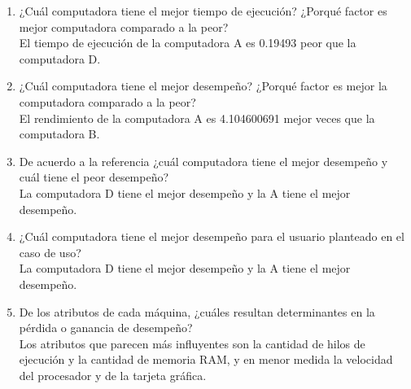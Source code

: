 \documentclass{article}
\begin{document}
    \begin{enumerate}
        \item {
            ¿Cuál computadora tiene el mejor tiempo de ejecución? ¿Porqué 
        factor es mejor computadora comparado a la peor? \\
        El tiempo de ejecución de la computadora A es 0.19493 peor que la 
        computadora D.
        }
        \item {
            ¿Cuál computadora tiene el mejor desempeño? ¿Porqué 
        factor es mejor la computadora comparado a la peor? \\
        El rendimiento de la computadora A es 4.104600691 mejor veces que la 
        computadora B.
        }
        \item {
            De acuerdo a la referencia ¿cuál computadora tiene el mejor desempeño
            y cuál tiene el peor desempeño? \\
            La computadora D tiene el mejor desempeño y la A tiene el mejor 
            desempeño.
        }
        \item {
            ¿Cuál computadora tiene el mejor desempeño para el usuario planteado
            en el caso de uso? \\
            La computadora D tiene el mejor desempeño y la A tiene el mejor 
            desempeño.
        }
        \item {
            De los atributos de cada máquina, ¿cuáles resultan determinantes en 
            la pérdida o ganancia de desempeño? \\
            Los atributos que parecen más influyentes son la cantidad de hilos 
            de ejecución y la cantidad de memoria RAM, y en menor medida la 
            velocidad del procesador y de la tarjeta gráfica.
        }
    \end{enumerate}
\end{document}
